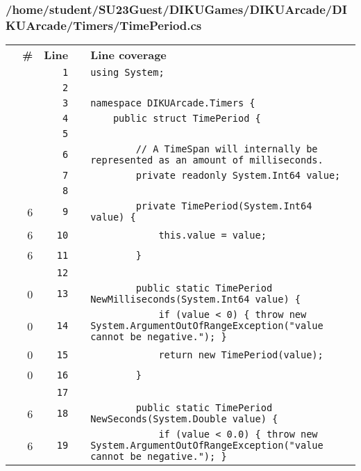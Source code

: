 \documentclass[a4paper,landscape,10pt]{article}
\begin{document}
\subsubsection{/home/student/SU23Guest/DIKUGames/DIKUArcade/DIKUArcade/Timers/TimePeriod.cs}
\begin{longtable}[l]{lrrll}
\textbf{} & \textbf{\#} & \textbf{Line} & \textbf{} & \textbf{Line coverage}\\
\cellcolor{gray} &  & \verb~1~ & & \verb~using System;~\\
\cellcolor{gray} &  & \verb~2~ & & \verb~~\\
\cellcolor{gray} &  & \verb~3~ & & \verb~namespace DIKUArcade.Timers {~\\
\cellcolor{gray} &  & \verb~4~ & & \verb~    public struct TimePeriod {~\\
\cellcolor{gray} &  & \verb~5~ & & \verb~~\\
\cellcolor{gray} &  & \verb~6~ & & \verb~        // A TimeSpan will internally be represented as an amount of milliseconds.~\\
\cellcolor{gray} &  & \verb~7~ & & \verb~        private readonly System.Int64 value;~\\
\cellcolor{gray} &  & \verb~8~ & & \verb~~\\
\cellcolor{green} & 6 & \verb~9~ & & \verb~        private TimePeriod(System.Int64 value) {~\\
\cellcolor{green} & 6 & \verb~10~ & & \verb~            this.value = value;~\\
\cellcolor{green} & 6 & \verb~11~ & & \verb~        }~\\
\cellcolor{gray} &  & \verb~12~ & & \verb~~\\
\cellcolor{red} & 0 & \verb~13~ & & \verb~        public static TimePeriod NewMilliseconds(System.Int64 value) {~\\
\cellcolor{red} & 0 & \verb~14~ & & \verb~            if (value < 0) { throw new System.ArgumentOutOfRangeException("value cannot be negative."); }~\\
\cellcolor{red} & 0 & \verb~15~ & & \verb~            return new TimePeriod(value);~\\
\cellcolor{red} & 0 & \verb~16~ & & \verb~        }~\\
\cellcolor{gray} &  & \verb~17~ & & \verb~~\\
\cellcolor{green} & 6 & \verb~18~ & & \verb~        public static TimePeriod NewSeconds(System.Double value) {~\\
\cellcolor{orange} & 6 & \verb~19~ & & \verb~            if (value < 0.0) { throw new System.ArgumentOutOfRangeException("value cannot be negative."); }~\\

\end{longtable}
\end{document}
